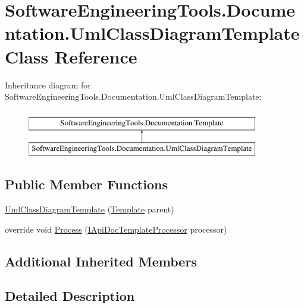 \hypertarget{class_software_engineering_tools_1_1_documentation_1_1_uml_class_diagram_template}{\section{Software\+Engineering\+Tools.\+Documentation.\+Uml\+Class\+Diagram\+Template Class Reference}
\label{class_software_engineering_tools_1_1_documentation_1_1_uml_class_diagram_template}
}
Inheritance diagram for Software\+Engineering\+Tools.\+Documentation.\+Uml\+Class\+Diagram\+Template\+:\begin{figure}[H]
\begin{center}
\leavevmode
\includegraphics[height=2.000000cm]{class_software_engineering_tools_1_1_documentation_1_1_uml_class_diagram_template}
\end{center}
\end{figure}
\subsection*{Public Member Functions}
\begin{DoxyCompactItemize}
\item 
\hyperlink{class_software_engineering_tools_1_1_documentation_1_1_uml_class_diagram_template_a7ab204291772d530844163ac25e30f6f}{Uml\+Class\+Diagram\+Template} (\hyperlink{class_software_engineering_tools_1_1_documentation_1_1_template}{Template} parent)
\item 
override void \hyperlink{class_software_engineering_tools_1_1_documentation_1_1_uml_class_diagram_template_a766af41d9501ca75b1020f0e65c173c2}{Process} (\hyperlink{interface_software_engineering_tools_1_1_documentation_1_1_i_api_doc_template_processor}{I\+Api\+Doc\+Template\+Processor} processor)
\end{DoxyCompactItemize}
\subsection*{Additional Inherited Members}


\subsection{Detailed Description}


